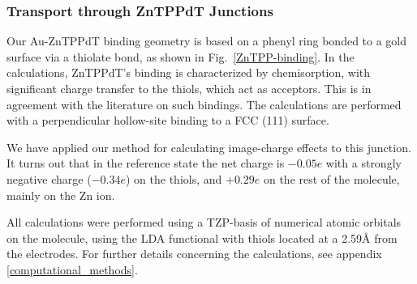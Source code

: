 \documentclass[aip,jcp,a4paper,reprint,floatfix,superscriptaddress]{revtex4-1}
\begin{document}
\subsubsection{Transport through ZnTPPdT Junctions}\label{transport}


Our Au-ZnTPPdT binding geometry is based on a phenyl ring bonded to a gold surface via a thiolate bond,\cite{Nara2004,Andrews2006,Kondo2006,Pontes2011} as shown in Fig.~\ref{ZnTPP-binding}. In the calculations, ZnTPPdT's binding is characterized by chemisorption, with significant charge transfer to the thiols, which act as acceptors. This is in agreement with the literature on such bindings.\cite{Xue2003a,Xue2003b,Love2005,Hoft2006,Romaner2006} The calculations are performed with a perpendicular hollow-site binding to a FCC (111) surface. 

We have applied our method for calculating image-charge effects to this junction. It turns out that in the reference state the net charge is $-0.05e$ with a strongly negative charge ($-0.34e$) on the thiols, and $+0.29e$ on the rest of the molecule, mainly on the Zn ion.

All calculations were performed using a TZP-basis of numerical atomic orbitals on the molecule, using the LDA functional  with thiols located at a 2.59\AA\xspace from the electrodes. For further details concerning the calculations, see appendix \ref{computational_methods}.\\
\end{document}
